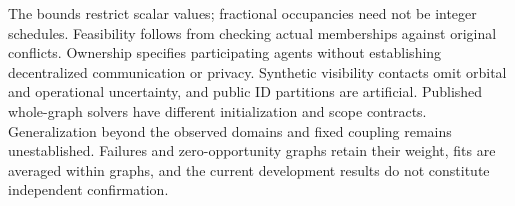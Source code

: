 The bounds restrict scalar values; fractional occupancies need not be
integer schedules. Feasibility follows from checking actual memberships
against original conflicts. Ownership specifies participating agents without
establishing decentralized communication or privacy. Synthetic visibility
contacts omit orbital and operational uncertainty, and public ID partitions
are artificial. Published whole-graph solvers have different initialization
and scope contracts. Generalization beyond the observed domains and fixed
coupling remains unestablished. Failures and zero-opportunity graphs retain
their weight, fits are averaged within graphs, and the current development
results do not constitute independent confirmation.

